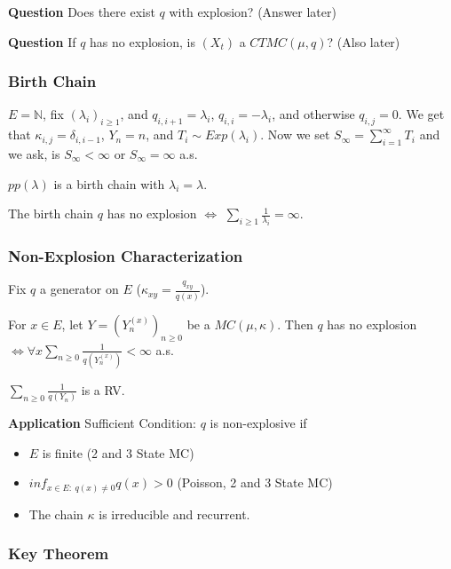 \textbf{Question} Does there exist $q$ with explosion? (Answer later)

\textbf{Question} If $q$ has no explosion, is $(X_t)$ a $CTMC(\mu, q)$? (Also later)

\subsubsection{Birth Chain}
$E= \mathbb{N}$, fix $(\lambda_i)_{i\geq 1}$, and $q_{i,i+1}= \lambda_i$, $q_{i,i}=-\lambda_i$, and otherwise $q_{i,j}=0$. We get that $\kappa_{i,j}= \delta_{i, i-1}$, $Y_n = n$, and $T_i \sim Exp(\lambda_i)$. Now we set $S_{\infty} = \sum_{i=1}^{\infty} T_i$ and we ask, is $S_\infty < \infty$ or $S_\infty = \infty$ a.s.

\begin{rmk}[]
	$pp(\lambda)$ is a birth chain with  $\lambda_i = \lambda$.
\end{rmk}

\begin{theorem}[]
	The birth chain $q$ has no explosion $\iff$ $\sum_{i\geq 1}^{} \frac{1}{\lambda_i} = \infty$.
\end{theorem}

\subsubsection{Non-Explosion Characterization} 
Fix $q$ a generator on $E$ ($\kappa_{xy}= \frac{q_{xy}}{q(x)}$).

\begin{theorem}[]
	For $x \in E$, let $Y=(Y_n^{(x)})_{n\geq 0}$ be a $MC(\mu, \kappa )$. Then $q$ has no explosion $\iff \forall x \sum_{n\geq 0}^{} \frac{1}{q(Y_n^{(x)})} < \infty $ a.s.
\end{theorem}

\begin{rmk}[]
	$ \sum_{n\geq 0}^{} \frac{1}{q(Y_n)}$ is a RV.
\end{rmk}
\noindent
\textbf{Application} Sufficient Condition: $q$ is non-explosive if
\begin{itemize}
	\item $E$ is finite (2 and 3 State MC)
	\item $inf_{x \in E:\ q(x) \neq 0}q(x) > 0 $ (Poisson, 2 and 3 State MC)
	\item The chain $\kappa $ is irreducible and recurrent.
\end{itemize}

\subsubsection{Key Theorem}

